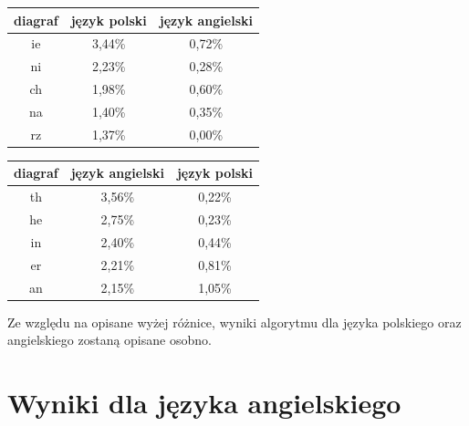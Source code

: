 \documentclass{xmgr}
\begin{document}
\begin{tabular}{ c | c | c }
  diagraf & język polski & język angielski \\
  \hline
  ie &	3,44\% &	0,72\% \\
  ni &	2,23\% &	0,28\% \\
  ch &	1,98\% &	0,60\% \\
  na &	1,40\% &	0,35\% \\
  rz &	1,37\% &	0,00\% \\
\end{tabular}
\begin{tabular}{ c | c | c }
  diagraf & język angielski & język polski \\
  \hline
  th &	3,56\% &	0,22\% \\
  he &	2,75\% &	0,23\% \\
  in &	2,40\% &	0,44\% \\
  er &	2,21\% &	0,81\% \\
  an &	2,15\% &	1,05\% \\
\end{tabular}\newline\newline

Ze względu na opisane wyżej różnice, wyniki algorytmu dla języka polskiego oraz angielskiego zostaną opisane osobno.


\section{Wyniki dla języka angielskiego}
\end{document}
